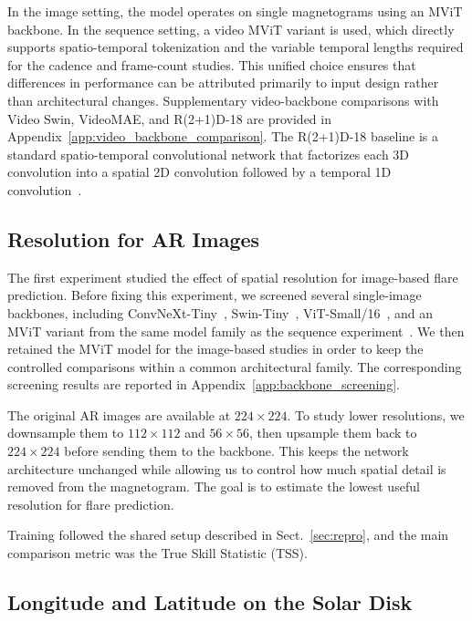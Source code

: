 In the image setting, the model operates on single magnetograms using an MViT backbone. In the sequence setting, a video MViT variant is used, which directly supports spatio-temporal tokenization and the variable temporal lengths required for the cadence and frame-count studies. This unified choice ensures that differences in performance can be attributed primarily to input design rather than architectural changes. Supplementary video-backbone comparisons with Video Swin, VideoMAE, and R(2+1)D-18 are provided in Appendix~\ref{app:video_backbone_comparison}. The R(2+1)D-18 baseline is a standard spatio-temporal convolutional network that factorizes each 3D convolution into a spatial 2D convolution followed by a temporal 1D convolution~\cite{ref_r2plus1d}.

\subsection{Resolution for AR Images}

The first experiment studied the effect of spatial resolution for image-based flare prediction. Before fixing this experiment, we screened several single-image backbones, including ConvNeXt-Tiny~\cite{ref_convnext}, Swin-Tiny~\cite{ref_swin}, ViT-Small/16~\cite{ref_vit}, and an MViT variant from the same model family as the sequence experiment~\cite{ref_mvit}. We then retained the MViT model for the image-based studies in order to keep the controlled comparisons within a common architectural family. The corresponding screening results are reported in Appendix~\ref{app:backbone_screening}.

The original AR images are available at $224 \times 224$. To study lower resolutions, we downsample them to $112 \times 112$ and $56 \times 56$, then upsample them back to $224 \times 224$ before sending them to the backbone. This keeps the network architecture unchanged while allowing us to control how much spatial detail is removed from the magnetogram. The goal is to estimate the lowest useful resolution for flare prediction.

Training followed the shared setup described in Sect.~\ref{sec:repro}, and the main comparison metric was the True Skill Statistic (TSS).

\subsection{Longitude and Latitude on the Solar Disk}
\label{sec:longitude_latitude_disk}

